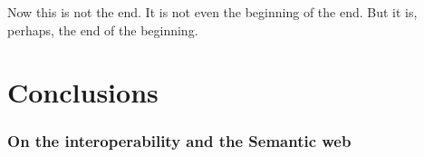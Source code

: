 

\begin{savequote}[50mm]
Now this is not the end. It is not even the beginning of the end. But it is, perhaps, the end of the beginning. 
\end{savequote}


\chapter{Conclusions}
\label{cha:conclusions}

\ifpdf
    \graphicspath{{5_conclusion/figures/PNG/}{5_conclusion/figures/PDF/}{5_conclusion/figures/}}
\else
    \graphicspath{{5_conclusion/figures/EPS/}{5_conclusion/figures/}}
\fi



\subsection{On the interoperability and the Semantic web}

